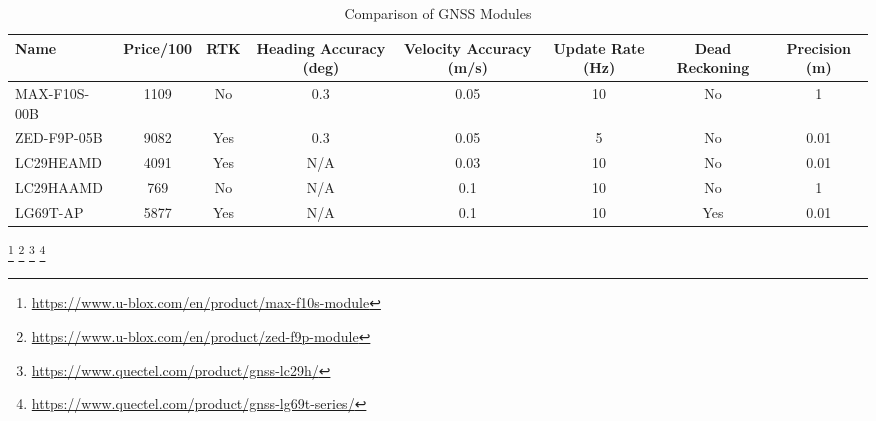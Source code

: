 \begin{table}[htbp]
  \centering
  \begin{tabular}{lccccccc}
    \toprule
    \textbf{Name} & \textbf{Price/100} & \textbf{RTK} & \textbf{Heading Accuracy (deg)} & \textbf{Velocity Accuracy (m/s)} & \textbf{Update Rate (Hz)} & \textbf{Dead Reckoning} & \textbf{Precision (m)} \\
    \midrule
    MAX-F10S-00B & 1109 & No  & 0.3 & 0.05 & 10 & No  & 1    \\
    ZED-F9P-05B & 9082 & Yes & 0.3 & 0.05 & 5  & No  & 0.01 \\
    LC29HEAMD & 4091 & Yes & N/A & 0.03 & 10 & No  & 0.01 \\
    LC29HAAMD & 769  & No  & N/A & 0.1  & 10 & No  & 1    \\
    LG69T-AP & 5877 & Yes & N/A & 0.1  & 10 & Yes & 0.01 \\
    \bottomrule
  \end{tabular}
   \caption{Comparison of GNSS Modules}
  \label{tab:gnss-modules}
\end{table}
\footnote{\url{https://www.u-blox.com/en/product/max-f10s-module}}
\footnote{\url{https://www.u-blox.com/en/product/zed-f9p-module}}
\footnote{\url{https://www.quectel.com/product/gnss-lc29h/}}
\footnote{\url{https://www.quectel.com/product/gnss-lg69t-series/}}


